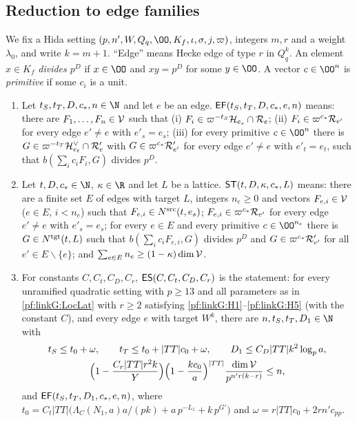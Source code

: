 \subsection{Reduction to edge families}\label{sec:pf:linkG:edges}

We fix a Hida setting $(p,n',W,Q_q,\OO,K_f,\iota,\sigma,j,\varpi)$, integers $m,r$ and a weight $\lambda_0$, and write
$k=m+1$. ``Edge'' means Hecke edge of type $r$ in $Q_q^k$. An element $x\in K_f$ \emph{divides $p^D$} if
$x\in\OO$ and $xy=p^D$ for some $y\in\OO$. A vector $c\in\OO^n$ is \emph{primitive} if some $c_i$ is a unit.

\begin{definition}\label{pf:linkG:edgefam}
\begin{enumerate}[label=(\alph*)]
\item Let $t_S,t_T,D,c_*,n\in\N$ and let $e$ be an edge. $\mathsf{EF}(t_S,t_T,D,c_*,e,n)$ means: there are
$F_1,\dots,F_n\in\mathcal V$ such that (i) $F_i\in\varpi^{-t_S}\mathcal H_{e_s}\cap\mathcal R_e$; (ii) $F_i\in\varpi^{c_*}\mathcal R_{e'}$
for every edge $e'\ne e$ with $e'_s=e_s$; (iii) for every primitive $c\in\OO^n$ there is
$G\in\varpi^{-t_T}\mathcal H_{e_t}^\vee\cap\mathcal R'_e$ with $G\in\varpi^{c_*}\mathcal R'_{e'}$ for every edge $e'\ne e$ with
$e'_t=e_t$, such that $b(\sum_ic_iF_i,G)$ divides $p^D$.
\item Let $t,D,c_*\in\N$, $\kappa\in\R$ and let $L$ be a lattice. $\mathsf{ST}(t,D,\kappa,c_*,L)$ means: there are a
finite set $E$ of edges with target $L$, integers $n_e\ge0$ and vectors $F_{e,i}\in\mathcal V$ ($e\in E$, $i<n_e$) such
that $F_{e,i}\in N^{\mathrm{src}}(t,e_s)$; $F_{e,i}\in\varpi^{c_*}\mathcal R_{e'}$ for every edge $e'\ne e$ with $e'_s=e_s$; for
every $e\in E$ and every primitive $c\in\OO^{n_e}$ there is $G\in N^{\mathrm{tgt}}(t,L)$ such that
$b(\sum_ic_iF_{e,i},G)$ divides $p^D$ and $G\in\varpi^{c_*}\mathcal R'_{e'}$ for all $e'\in E\smallsetminus\{e\}$; and
$\sum_{e\in E}n_e\ge(1-\kappa)\dim\mathcal V$.
\item For constants $C,C_{t},C_{D},C_r$, $\mathsf{ES}(C,C_t,C_D,C_r)$ is the statement: for every unramified quadratic
setting with $p\ge13$ and all parameters as in \cref{pf:linkG:LocLat} with $r\ge2$ satisfying
\ref{pf:linkG:H1}--\ref{pf:linkG:H5} (with the constant $C$), and every edge $e$ with target $W^k$, there are
$n,t_S,t_T,D_1\in\N$ with
\begin{gather*}
t_S\le t_0+\omega,\qquad t_T\le t_0+|TT|c_0+\omega,\qquad D_1\le C_D|TT|k^2\log_pa,\\
\Bigl(1-\frac{C_r|TT|r^2k}{Y}\Bigr)\Bigl(1-\frac{kc_0}{a}\Bigr)^{|TT|}\frac{\dim\mathcal V}{p^{n'r(k-r)}}\le n,
\end{gather*}
and $\mathsf{EF}(t_S,t_T,D_1,c_*,e,n)$, where
$t_0=C_t|TT|\bigl(\Lambda_C(N_1,a)a/(pk)+a\,p^{-L_1}+k\,p^{G'}\bigr)$ and $\omega=r|TT|c_0+2rn'c_{pp}$.
\end{enumerate}
\end{definition}

